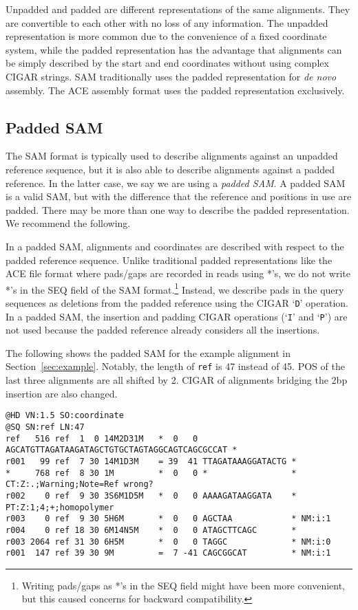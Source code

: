 \documentclass[10pt]{article}
\begin{document}
Unpadded and padded are different representations of the same alignments. They
are convertible to each other with no loss of any information. The unpadded
representation is more common due to the convenience of a fixed coordinate system,
while the padded representation has the advantage that alignments can be simply
described by the start and end coordinates without using complex CIGAR strings.
SAM traditionally uses the padded representation for {\it de novo} assembly.
The ACE assembly format uses the padded representation exclusively.

\subsection{Padded SAM}

The SAM format is typically used to describe alignments against an unpadded
reference sequence, but it is also able to describe alignments against a padded
reference. In the latter case, we say we are using a \emph{padded SAM}. A padded
SAM is a valid SAM, but with the difference that the reference and positions in
use are padded. There may be more than one way to describe the padded
representation. We recommend the following.

In a padded SAM, alignments and coordinates are described with respect to the
padded reference sequence. Unlike traditional padded representations like
the ACE file format where pads/gaps are recorded in reads using *'s, we do
not write *'s in the {\sf SEQ} field of the SAM format.\footnote{Writing
pads/gaps as *'s in the {\sf SEQ} field might have been more convenient, but
this caused concerns for backward compatibility.} Instead, we describe pads
in the query sequences as deletions from the padded reference using the
{\sf CIGAR} `{\tt D}' operation. In a padded SAM, the insertion and padding
CIGAR operations (`{\tt I}' and `{\tt P}') are not used because the padded
reference already considers all the insertions.

The following shows the padded SAM for the example alignment in Section~\ref{sec:example}.
Notably, the length of {\tt ref} is 47 instead of 45. {\sf POS} of the last
three alignments are all shifted by 2. {\sf CIGAR} of alignments bridging the
2bp insertion are also changed.

\begin{framed}\small
\begin{verbatim}
@HD VN:1.5 SO:coordinate
@SQ SN:ref LN:47
ref   516 ref  1  0 14M2D31M   *  0   0 AGCATGTTAGATAAGATAGCTGTGCTAGTAGGCAGTCAGCGCCAT *
r001   99 ref  7 30 14M1D3M    = 39  41 TTAGATAAAGGATACTG *
*     768 ref  8 30 1M         *  0   0 *                 * CT:Z:.;Warning;Note=Ref wrong?
r002    0 ref  9 30 3S6M1D5M   *  0   0 AAAAGATAAGGATA    * PT:Z:1;4;+;homopolymer
r003    0 ref  9 30 5H6M       *  0   0 AGCTAA            * NM:i:1
r004    0 ref 18 30 6M14N5M    *  0   0 ATAGCTTCAGC       *
r003 2064 ref 31 30 6H5M       *  0   0 TAGGC             * NM:i:0
r001  147 ref 39 30 9M         =  7 -41 CAGCGGCAT         * NM:i:1
\end{verbatim}
\end{framed}
\end{document}
